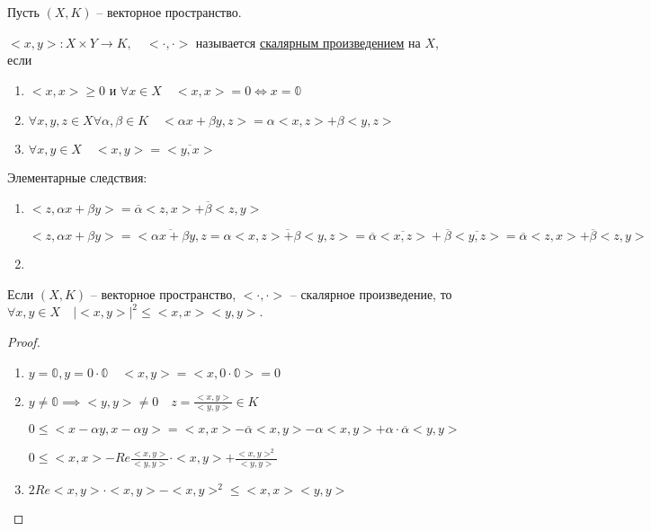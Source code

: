 \documentclass{book}
\theoremstyle{definition}
\begin{document}
    \begin{definition}
        Пусть $(X,K)$ -- векторное пространство.

        $<x,y> :X\times Y \to  K, \quad <\cdot,\cdot>$ называется \underline{скалярным произведением} на $X$, если
        \begin{enumerate}
            \item $<x,x> \geqslant 0$ и $\forall x\in X\quad <x,x> = 0 \iff x=\mathbb{0} $
            \item $\forall x, y, z \in X \forall \alpha, \beta \in K\quad <\alpha x+\beta y,z> = \alpha <x,z> + \beta <y,z>$
            \item $\forall x, y\in X\quad <x,y> = \overline{<y,x>}$
        \end{enumerate}
    \end{definition}

    Элементарные следствия:
    \begin{enumerate}
        \item $<z,\alpha x + \beta y> = \overline{\alpha}<z,x> + \overline{\beta}<z,y>$

            $<z,\alpha x + \beta y> = \overline{<\alpha x + \beta y,z}  = \overline{\alpha<x,z> + \beta <y,z>} = \overline{\alpha}\overline{<x,z>} + \overline{\beta}\overline{<y,z>} = \overline{\alpha}<z,x> + \overline{\beta}<z,y>$
        \item
    \end{enumerate}

    \begin{statement}
        Если $(X,K)$ -- векторное пространство, $<\cdot , \cdot >$ -- скалярное произведение, то $\forall x, y\in X\quad \left| <x,y> \right| ^2\leqslant <x,x><y,y>$.
    \end{statement}
    \begin{proof}
        \begin{enumerate}
            \item $y = \mathbb{0}, y = 0\cdot\mathbb{0}\quad <x,y> = <x,0\cdot \mathbb{0}> = 0$
            \item $y\neq \mathbb{0} \implies <y,y>\neq 0\quad z = \frac{<x,y>}{<y,y>} \in K$

            $0\leqslant <x-\alpha y, x - \alpha y> = <x,x> - \overline{\alpha} <x,y> - \alpha <x,y> + \alpha\cdot \overline{\alpha}<y,y>$

            $0\leqslant <x,x> - Re \frac{<x,y>}{<y,y>} \cdot  <x,y> + \frac{<x,y>^2}{<y,y>}$
            \item $2Re <x,y> \cdot  <x,y> - <x,y>^2 \leqslant <x,x><y,y>$ 
        \end{enumerate}
    \end{proof}
\end{document}
